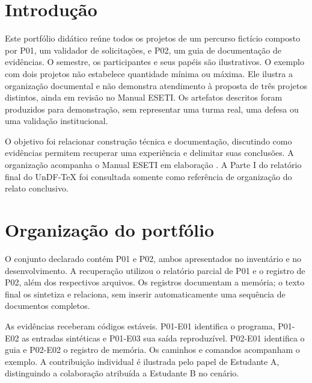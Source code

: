 \chapter{Introdução}
Este portfólio didático reúne todos os projetos de um percurso fictício
composto por P01, um validador de solicitações, e P02, um guia de documentação
de evidências. O semestre, os participantes e seus papéis são ilustrativos.
O exemplo com dois projetos não estabelece quantidade mínima ou máxima.
Ele ilustra a organização documental e não demonstra atendimento à proposta
de três projetos distintos, ainda em revisão no Manual ESETI.
Os artefatos descritos foram produzidos para demonstração, sem representar
uma turma real, uma defesa ou uma validação institucional.

O objetivo foi relacionar construção técnica e documentação, discutindo
como evidências permitem recuperar uma experiência e delimitar suas conclusões.
A organização acompanha o Manual ESETI em elaboração .
A Parte I do relatório final do UnDF-TeX  foi consultada
somente como referência de organização do relato conclusivo.

\chapter{Organização do portfólio}
O conjunto declarado contém P01 e P02, ambos apresentados no inventário e
no desenvolvimento. A recuperação utilizou o relatório parcial de P01 e o
registro de P02, além dos respectivos arquivos. Os registros documentam a
memória; o texto final os sintetiza e relaciona, sem inserir automaticamente
uma sequência de documentos completos.

As evidências receberam códigos estáveis. P01-E01 identifica o programa,
P01-E02 as entradas sintéticas e P01-E03 sua saída reproduzível. P02-E01
identifica o guia e P02-E02 o registro de memória. Os caminhos e comandos
acompanham o exemplo. A contribuição individual é ilustrada pelo papel de
Estudante A, distinguindo a colaboração atribuída a Estudante B no cenário.

